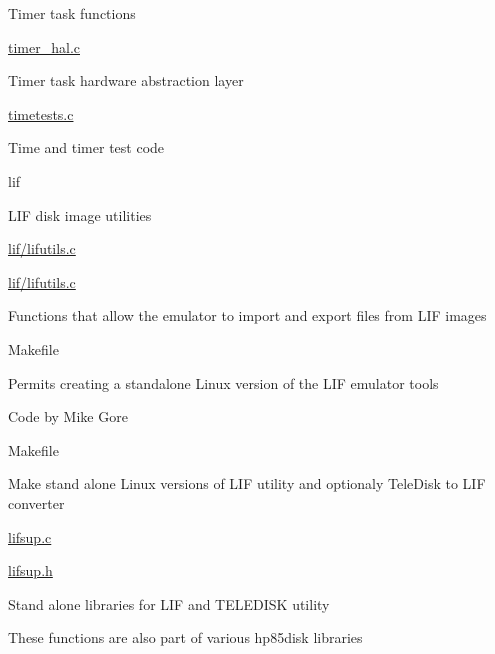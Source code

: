 \begin{DoxyItemize}
\begin{DoxyItemize}
\begin{DoxyItemize}
\item Timer task functions
\end{DoxyItemize}
\item \hyperlink{timer__hal_8c}{timer\+\_\+hal.\+c}
\begin{DoxyItemize}
\item Timer task hardware abstraction layer
\end{DoxyItemize}
\item \hyperlink{timetests_8c}{timetests.\+c}
\begin{DoxyItemize}
\item Time and timer test code
\end{DoxyItemize}
\end{DoxyItemize}
\item lif
\begin{DoxyItemize}
\item L\+IF disk image utilities
\item \hyperlink{lifutils_8c}{lif/lifutils.\+c}
\item \hyperlink{lifutils_8c}{lif/lifutils.\+c}
\begin{DoxyItemize}
\item Functions that allow the emulator to import and export files from L\+IF images
\end{DoxyItemize}
\item Makefile
\begin{DoxyItemize}
\item Permits creating a standalone Linux version of the L\+IF emulator tools
\end{DoxyItemize}
\item Code by Mike Gore
\begin{DoxyItemize}
\item Makefile
\begin{DoxyItemize}
\item Make stand alone Linux versions of L\+IF utility and optionaly Tele\+Disk to L\+IF converter
\end{DoxyItemize}
\item \hyperlink{lifsup_8c}{lifsup.\+c}
\item \hyperlink{lifsup_8h}{lifsup.\+h}
\begin{DoxyItemize}
\item Stand alone libraries for L\+IF and T\+E\+L\+E\+D\+I\+SK utility
\begin{DoxyItemize}
\item These functions are also part of various hp85disk libraries

\end{DoxyItemize}
\end{DoxyItemize}
\end{DoxyItemize}
\end{DoxyItemize}
\end{DoxyItemize}
